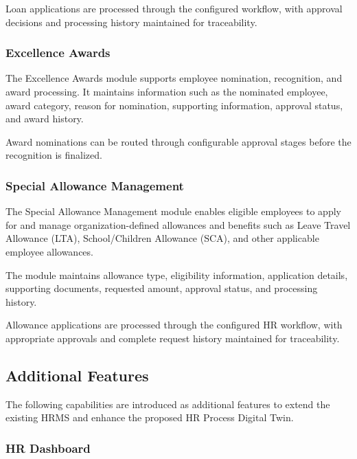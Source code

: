 \documentclass[12pt,a4paper]{article}
\begin{document}
Loan applications are processed through the configured workflow,
with approval decisions and processing history maintained for
traceability.

\subsubsection{Excellence Awards}

The Excellence Awards module supports employee nomination,
recognition, and award processing. It maintains information such as
the nominated employee, award category, reason for nomination,
supporting information, approval status, and award history.

Award nominations can be routed through configurable approval
stages before the recognition is finalized.

\subsubsection{Special Allowance Management}

The Special Allowance Management module enables eligible employees
to apply for and manage organization-defined allowances and
benefits such as Leave Travel Allowance (LTA), School/Children
Allowance (SCA), and other applicable employee allowances.

The module maintains allowance type, eligibility information,
application details, supporting documents, requested amount,
approval status, and processing history.

Allowance applications are processed through the configured HR
workflow, with appropriate approvals and complete request history
maintained for traceability.


\subsection{Additional Features}

The following capabilities are introduced as additional features
to extend the existing HRMS and enhance the proposed HR Process
Digital Twin.

\subsubsection{HR Dashboard}
\end{document}
